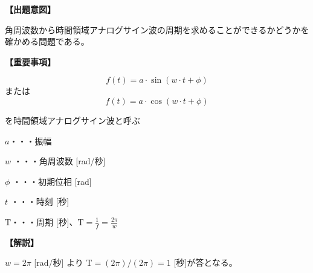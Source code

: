 \noindent \textbf{【出題意図】}

\noindent 角周波数から時間領域アナログサイン波の周期を求めることができるかどうかを確かめる問題である。

\vspace{1em}
\noindent \textbf{【重要事項】}

\[
f(t) = a \cdot \sin( w \cdot t + \phi )
\]
%
\noindent または
%
\[
f(t) = a \cdot \cos( w \cdot t + \phi )
\]

\medskip
\noindent を時間領域アナログサイン波と呼ぶ

\bigskip
\noindent $a$・・・振幅

\bigskip
\noindent $w$ ・・・角周波数 [rad/秒]

\bigskip
\noindent $\phi$ ・・・初期位相 [rad]

\bigskip
\noindent $t$ ・・・時刻 [秒]

\bigskip
$\textrm{T}$・・・周期 [秒]、$\textrm{T} = \frac{1}{f} = \frac{2\pi}{w}$


\vspace{1em}
\noindent \textbf{【解説】}

\noindent $w = 2\pi$ [rad/秒] より $\textrm{T} = (2\pi)/(2\pi) = 1$ [秒]が答となる。
